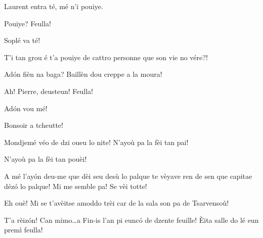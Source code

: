
\DramPer


\begin{drama}

\Pierrespeaks Laurent entra té, mé n'i pouiye.

\Laurentspeaks Pouiye? Feulla!

\Pierrespeaks {} Soplé va té!

\Laurentspeaks T'i tan grou é t'a pouiye de cattro personne que son vie no vére?!

\Pierrespeaks Ad\'on fièn na baga? Baillèn dou creppe a la moura!


\Laurentspeaks Ah! Pierre, deusteun! Feulla!

\Pierrespeaks{} Ad\'on vou mé!


\Pierrespeaks Bonsoir a tcheutte!


\Pierrespeaks{} Mondjemé véo de dzi oueu lo nite! N'ayoù pa la fèi tan pai!

\Laurentspeaks{} N'ayoù pa la fèi tan pouèi!

\Pierrespeaks A mé l'ay\'on deu-me que dèi seu desù lo palque te vèyave ren de sen que capitae déz\'o lo palque!  Mi me semble pa! Se vèi totte!

\Laurentspeaks Eh ouè! Mi se t'avèitse amoddo trèi car de la sala son pa de Tsarvensoù!

\Pierrespeaks T'a rèiz\'on! Can mimo\ldots a Fin-is l'an pi eunc\'o de dzente feuille! \`Eita salle do lé eun premì feulla!



\end{drama}

